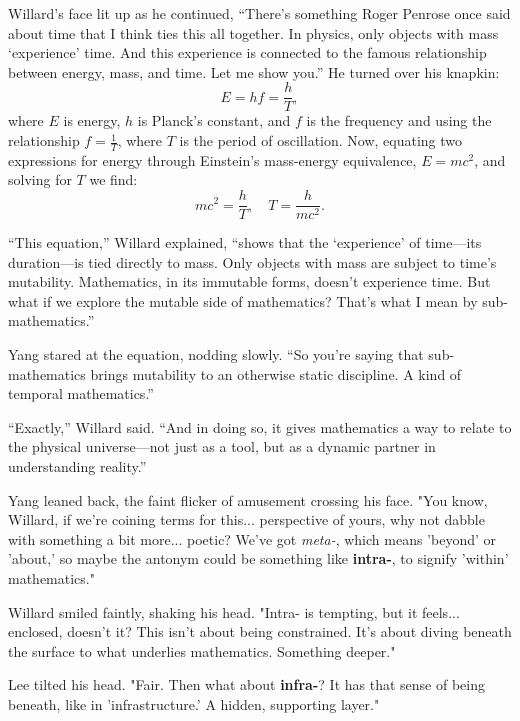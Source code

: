 Willard’s face lit up as he continued, “There’s something Roger Penrose once said about time that I think ties this all together. In physics, only objects with mass ‘experience’ time. And this experience is connected to the famous relationship between energy, mass, and time. Let me show you.”
He turned over his knapkin:
\[
E = hf= \frac{h}{T},
\]
where \(E\) is energy, \(h\) is Planck’s constant, and \(f\) is the frequency and using the relationship \(f = \frac{1}{T}\), where \(T\) is the period of oscillation. Now, equating two expressions for energy through Einstein’s mass-energy equivalence, \(E = mc^2\), and solving for \(T\) we find:
\[
mc^2 = \frac{h}{T}, \quad 
T = \frac{h}{mc^2}.
\]

“This equation,” Willard explained, “shows that the ‘experience’ of time—its duration—is tied directly to mass. Only objects with mass are subject to time’s mutability. Mathematics, in its immutable forms, doesn’t experience time. But what if we explore the mutable side of mathematics? That’s what I mean by sub-mathematics.”

Yang stared at the equation, nodding slowly. “So you’re saying that sub-mathematics brings mutability to an otherwise static discipline. A kind of temporal mathematics.”

“Exactly,” Willard said. “And in doing so, it gives mathematics a way to relate to the physical universe—not just as a tool, but as a dynamic partner in understanding reality.”


Yang leaned back, the faint flicker of amusement crossing his face. "You know, Willard, if we're coining terms for this... perspective of yours, why not dabble with something a bit more... poetic? We've got \textit{meta-}, which means 'beyond' or 'about,' so maybe the antonym could be something like \textbf{intra-}, to signify 'within' mathematics."

Willard smiled faintly, shaking his head. "Intra- is tempting, but it feels... enclosed, doesn't it? This isn't about being constrained. It's about diving beneath the surface to what underlies mathematics. Something deeper."

Lee tilted his head. "Fair. Then what about \textbf{infra-}? It has that sense of being beneath, like in 'infrastructure.' A hidden, supporting layer."

